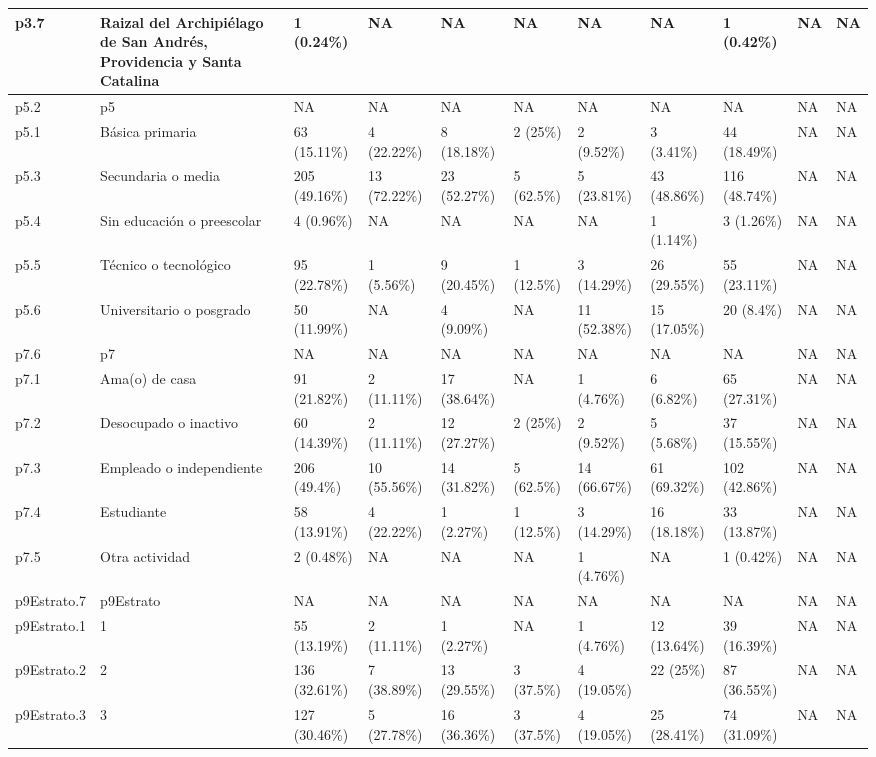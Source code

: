 \begin{table}
{\begin{tabular}[t]{l|l|l|l|l|l|l|l|l|l|l}
p3.7 & Raizal del Archipiélago de San Andrés, Providencia y Santa Catalina & 1 (0.24\%) & NA & NA & NA & NA & NA & 1 (0.42\%) & NA & NA\\
\hline
p5.2 & p5 & NA & NA & NA & NA & NA & NA & NA & NA & NA\\
\hline
p5.1 & Básica primaria & 63 (15.11\%) & 4 (22.22\%) & 8 (18.18\%) & 2 (25\%) & 2 (9.52\%) & 3 (3.41\%) & 44 (18.49\%) & NA & NA\\
\hline
p5.3 & Secundaria o media & 205 (49.16\%) & 13 (72.22\%) & 23 (52.27\%) & 5 (62.5\%) & 5 (23.81\%) & 43 (48.86\%) & 116 (48.74\%) & NA & NA\\
\hline
p5.4 & Sin educación o preescolar & 4 (0.96\%) & NA & NA & NA & NA & 1 (1.14\%) & 3 (1.26\%) & NA & NA\\
\hline
p5.5 & Técnico o tecnológico & 95 (22.78\%) & 1 (5.56\%) & 9 (20.45\%) & 1 (12.5\%) & 3 (14.29\%) & 26 (29.55\%) & 55 (23.11\%) & NA & NA\\
\hline
p5.6 & Universitario o posgrado & 50 (11.99\%) & NA & 4 (9.09\%) & NA & 11 (52.38\%) & 15 (17.05\%) & 20 (8.4\%) & NA & NA\\
\hline
p7.6 & p7 & NA & NA & NA & NA & NA & NA & NA & NA & NA\\
\hline
p7.1 & Ama(o) de casa & 91 (21.82\%) & 2 (11.11\%) & 17 (38.64\%) & NA & 1 (4.76\%) & 6 (6.82\%) & 65 (27.31\%) & NA & NA\\
\hline
p7.2 & Desocupado o inactivo & 60 (14.39\%) & 2 (11.11\%) & 12 (27.27\%) & 2 (25\%) & 2 (9.52\%) & 5 (5.68\%) & 37 (15.55\%) & NA & NA\\
\hline
p7.3 & Empleado o independiente & 206 (49.4\%) & 10 (55.56\%) & 14 (31.82\%) & 5 (62.5\%) & 14 (66.67\%) & 61 (69.32\%) & 102 (42.86\%) & NA & NA\\
\hline
p7.4 & Estudiante & 58 (13.91\%) & 4 (22.22\%) & 1 (2.27\%) & 1 (12.5\%) & 3 (14.29\%) & 16 (18.18\%) & 33 (13.87\%) & NA & NA\\
\hline
p7.5 & Otra actividad & 2 (0.48\%) & NA & NA & NA & 1 (4.76\%) & NA & 1 (0.42\%) & NA & NA\\
\hline
p9Estrato.7 & p9Estrato & NA & NA & NA & NA & NA & NA & NA & NA & NA\\
\hline
p9Estrato.1 & 1 & 55 (13.19\%) & 2 (11.11\%) & 1 (2.27\%) & NA & 1 (4.76\%) & 12 (13.64\%) & 39 (16.39\%) & NA & NA\\
\hline
p9Estrato.2 & 2 & 136 (32.61\%) & 7 (38.89\%) & 13 (29.55\%) & 3 (37.5\%) & 4 (19.05\%) & 22 (25\%) & 87 (36.55\%) & NA & NA\\
\hline
p9Estrato.3 & 3 & 127 (30.46\%) & 5 (27.78\%) & 16 (36.36\%) & 3 (37.5\%) & 4 (19.05\%) & 25 (28.41\%) & 74 (31.09\%) & NA & NA\\

\end{tabular}}
\end{table}
